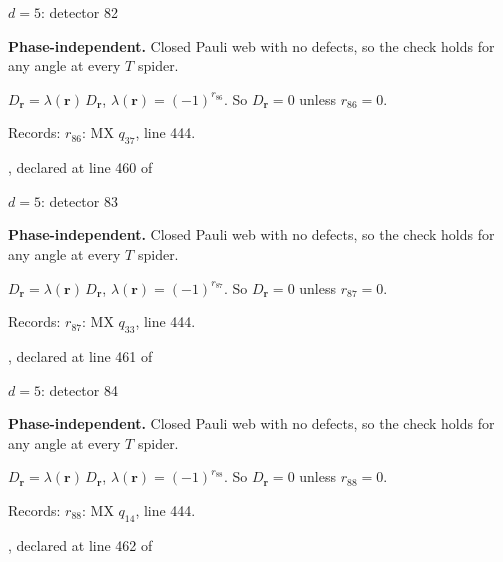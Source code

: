 \label{d5_det082}
{\Large $d=5$: detector 82}\par
\textbf{Phase-independent.} Closed Pauli web with no defects, so the check holds for any angle at every $T$ spider.
\begin{center}
\end{center}
\vspace{-1mm}
$D_{\boldsymbol r}=\lambda(\boldsymbol r)\,D_{\boldsymbol r}$, \quad $\lambda(\boldsymbol r)=(-1)^{r_{86}}$. \qquad So $D_{\boldsymbol r}=0$ unless $r_{86}=0$.
\par\smallskip\begin{minipage}{.98\linewidth}\small Records: $r_{86}$: MX $q_{37}$, line 444.\end{minipage}
\vfill
{\footnotesize\texttt{}, declared at line 460 of \texttt{}}
\newpage

\label{d5_det083}
{\Large $d=5$: detector 83}\par
\textbf{Phase-independent.} Closed Pauli web with no defects, so the check holds for any angle at every $T$ spider.
\begin{center}
\end{center}
\vspace{-1mm}
$D_{\boldsymbol r}=\lambda(\boldsymbol r)\,D_{\boldsymbol r}$, \quad $\lambda(\boldsymbol r)=(-1)^{r_{87}}$. \qquad So $D_{\boldsymbol r}=0$ unless $r_{87}=0$.
\par\smallskip\begin{minipage}{.98\linewidth}\small Records: $r_{87}$: MX $q_{33}$, line 444.\end{minipage}
\vfill
{\footnotesize\texttt{}, declared at line 461 of \texttt{}}
\newpage

\label{d5_det084}
{\Large $d=5$: detector 84}\par
\textbf{Phase-independent.} Closed Pauli web with no defects, so the check holds for any angle at every $T$ spider.
\begin{center}
\end{center}
\vspace{-1mm}
$D_{\boldsymbol r}=\lambda(\boldsymbol r)\,D_{\boldsymbol r}$, \quad $\lambda(\boldsymbol r)=(-1)^{r_{88}}$. \qquad So $D_{\boldsymbol r}=0$ unless $r_{88}=0$.
\par\smallskip\begin{minipage}{.98\linewidth}\small Records: $r_{88}$: MX $q_{14}$, line 444.\end{minipage}
\vfill
{\footnotesize\texttt{}, declared at line 462 of \texttt{}}
\newpage

